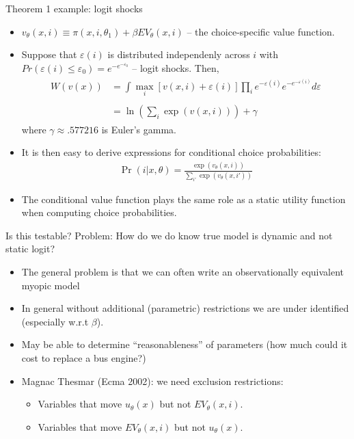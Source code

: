 \documentclass[aspectratio=169,11pt]{beamer}
\begin{document}
\begin{frame}{Theorem 1 example: logit shocks}
\footnotesize
\begin{itemize}
	\item $v_{\theta}\left(x,i\right) \equiv \pi \left(x,i,\theta_{1}\right)+\beta EV_{\theta}\left(x,i\right)$ -- the \alert{choice-specific value function}.

	\smallskip
	\item Suppose that $\varepsilon\left(i\right)$ is distributed independenly
	across $i$ with $Pr\left(\varepsilon\left(i\right)\le\varepsilon_{0}\right)=e^{-e^{-\varepsilon_{0}}}$ -- logit shocks.
	Then,
	\begin{align*}
	\begin{array}{ccl}
	W\left(v\left(x\right)\right) & =  
	\int\max_{i}\left[v\left(x,i\right)+\varepsilon\left(i\right)\right]
	\prod_{i}e^{-\varepsilon\left(i\right)}e^{-e^{-\varepsilon\left(i\right)}}d\varepsilon\\
	\\
	 & =  \ln\left(\sum_{i}\exp\left(v\left(x,i\right)\right)\right)+\gamma
	\end{array}
	\end{align*}
	where $\gamma\approx .577216$ is Euler's gamma.

	\smallskip
	\item It is then easy to derive expressions for conditional choice probabilities:
	\begin{align*}
	\Pr\left(i|x,\theta\right)= \frac{\exp\left(v_{\theta}\left(x,i\right)\right)}{\sum_{i'}\exp\left(v_{\theta}\left(x,i'\right)\right)}
	\end{align*}
	\smallskip
	\item The conditional value function plays the same role as a static utility function
	when computing choice probabilities.
\end{itemize}
\end{frame}


\begin{frame}{Is this testable?}
Problem: How do we do know true model is dynamic and not static logit?
\begin{itemize}
\item The general problem is that we can often write an observationally equivalent \alert{myopic model}
\item In general without additional (parametric) restrictions we are under identified (especially w.r.t $\beta$).
\item May be able to determine ``reasonableness'' of parameters (how much could it cost to replace a bus engine?)
\item Magnac Thesmar (Ecma 2002): we need \alert{exclusion restrictions}:
\begin{itemize}
\item Variables that move $u_{\theta}(x)$ but not $EV_{\theta}(x,i)$.
\item Variables that move $EV_{\theta}(x,i)$ but not $u_{\theta}(x)$.
\end{itemize}
\end{itemize}
\end{frame}
\end{document}
